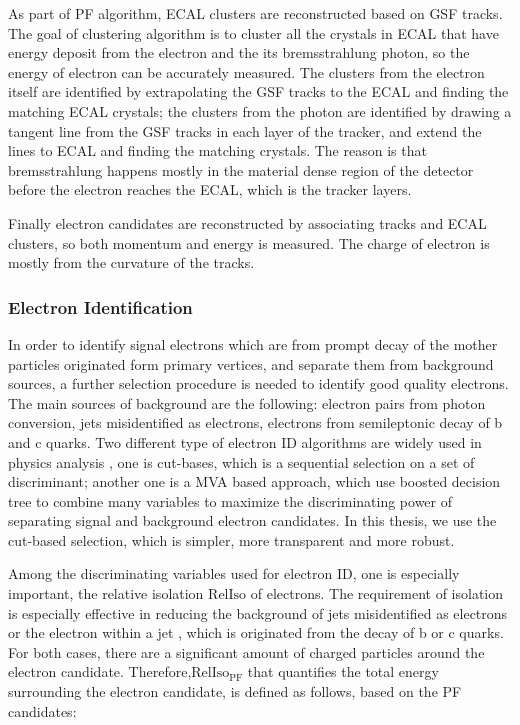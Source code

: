 As part of PF algorithm, ECAL clusters are reconstructed based on GSF tracks. The goal of clustering algorithm is to cluster all the crystals in ECAL that have energy deposit from the electron and the its bremsstrahlung photon, so the energy of electron can be accurately measured. The clusters from the electron itself are identified by extrapolating the GSF tracks to the ECAL and finding the matching ECAL crystals; the clusters from the photon are identified by drawing a tangent line from the GSF tracks in each layer of the tracker, and extend the lines to ECAL and finding the matching crystals. The reason is that bremsstrahlung happens mostly in the material dense region of the detector before the electron reaches the ECAL, which is the tracker layers.

Finally electron candidates are reconstructed by associating tracks and ECAL clusters, so both momentum and energy is measured. The charge of electron is mostly from the curvature of the tracks. 

\subsubsection*{Electron Identification}

In order to identify signal electrons which are from prompt decay of the mother particles originated form primary vertices, and separate them from background sources, a further selection procedure is needed to identify good quality electrons. The main sources of background are the following: electron pairs from photon conversion, jets misidentified as electrons, electrons from semileptonic decay of b and c quarks. Two different type of electron ID algorithms are widely used in physics analysis , one is cut-bases, which is a sequential selection on a set of discriminant; another one is a MVA based approach, which use boosted decision tree to combine many variables to maximize the discriminating power of separating signal and background electron candidates. In this thesis, we use the cut-based selection, which is simpler, more transparent and more robust. 

Among the discriminating variables used for electron ID, one is especially important, the relative isolation $\mathrm{RelIso}$ of electrons. The requirement of isolation is especially effective in reducing the background of jets misidentified as electrons or the electron within a jet , which is originated from the decay of b or c quarks. For both cases, there are a significant amount of charged particles around the electron candidate. Therefore,$\mathrm{RelIso_{PF}}$ that quantifies the total energy surrounding the electron candidate, is defined as follows, based on the PF candidates:

